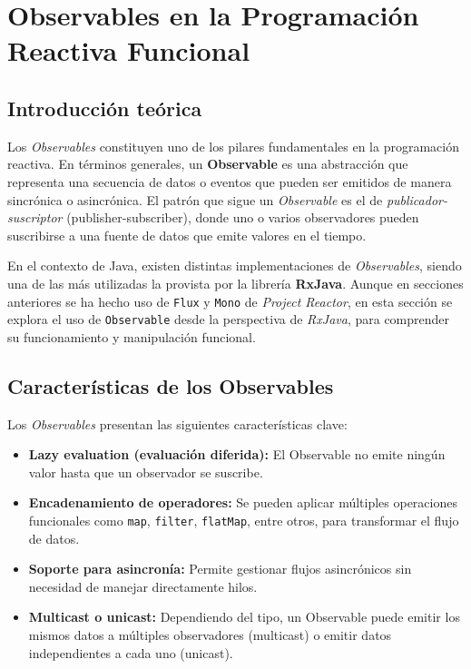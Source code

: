 \section{Observables en la Programación Reactiva Funcional}

\subsection{Introducción teórica}

Los \textit{Observables} constituyen uno de los pilares fundamentales en la programación reactiva. En términos generales, un \textbf{Observable} es una abstracción que representa una secuencia de datos o eventos que pueden ser emitidos de manera sincrónica o asincrónica. El patrón que sigue un \textit{Observable} es el de \textit{publicador-suscriptor} (publisher-subscriber), donde uno o varios observadores pueden suscribirse a una fuente de datos que emite valores en el tiempo.

En el contexto de Java, existen distintas implementaciones de \textit{Observables}, siendo una de las más utilizadas la provista por la librería \textbf{RxJava}. Aunque en secciones anteriores se ha hecho uso de \texttt{Flux} y \texttt{Mono} de \textit{Project Reactor}, en esta sección se explora el uso de \texttt{Observable} desde la perspectiva de \textit{RxJava}, para comprender su funcionamiento y manipulación funcional.

\subsection{Características de los Observables}

Los \textit{Observables} presentan las siguientes características clave:

\begin{itemize}
    \item \textbf{Lazy evaluation (evaluación diferida):} El Observable no emite ningún valor hasta que un observador se suscribe.
    \item \textbf{Encadenamiento de operadores:} Se pueden aplicar múltiples operaciones funcionales como \texttt{map}, \texttt{filter}, \texttt{flatMap}, entre otros, para transformar el flujo de datos.
    \item \textbf{Soporte para asincronía:} Permite gestionar flujos asincrónicos sin necesidad de manejar directamente hilos.
    \item \textbf{Multicast o unicast:} Dependiendo del tipo, un Observable puede emitir los mismos datos a múltiples observadores (multicast) o emitir datos independientes a cada uno (unicast).
\end{itemize}

